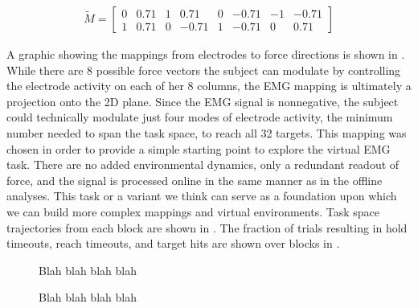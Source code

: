\documentclass[../main.tex]{subfiles}
\begin{document}
\begin{align}
\tilde{M} =
\begin{bmatrix}
0  & 0.71  & 1   & 0.71   & 0  & -0.71  & -1  & -0.71 \\
1  & 0.71  & 0  & -0.71  & 1   & -0.71   & 0   & 0.71
\end{bmatrix}
\end{align}

A graphic showing the mappings from electrodes to force directions is shown in . While there are 8 possible force vectors the subject can modulate by controlling the electrode activity on each of her 8 columns, the EMG mapping is ultimately a projection onto the 2D plane. Since the EMG signal is nonnegative, the subject could technically modulate just four modes of electrode activity, the minimum number needed to span the task space, to reach all 32 targets. This mapping was chosen in order to provide a simple starting point to explore the virtual EMG task. There are no added environmental dynamics, only a redundant readout of force, and the signal is processed online in the same manner as in the offline analyses. This task or a variant we think can serve as a foundation upon which we can build more complex mappings and virtual environments. Task space trajectories from each block are shown in . The fraction of trials resulting in hold timeouts, reach timeouts, and target hits are shown over blocks in .


\begin{figure}[H]
  \caption{Blah blah blah blah}\label{fig:behavior}
\end{figure}

\begin{figure}[H]
  \caption{Blah blah blah blah}\label{fig:behavior}
\end{figure}
\end{document}
